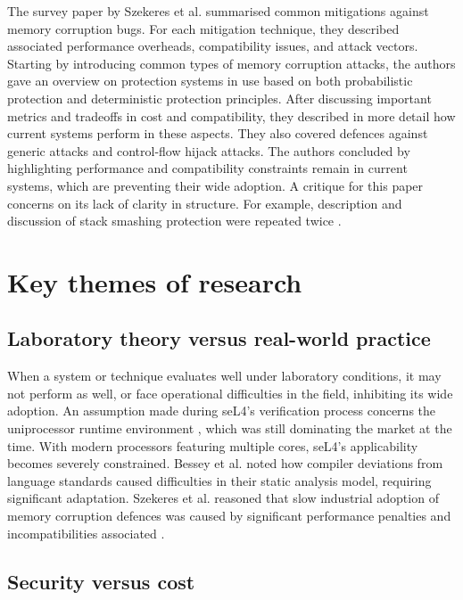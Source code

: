 \documentclass[11pt]{article}
\begin{document}
The survey paper by Szekeres et al. \cite{szekeres2013sok} summarised common mitigations against memory corruption bugs. For each mitigation technique, they described associated performance overheads, compatibility issues, and attack vectors. Starting by introducing common types of memory corruption attacks, the authors gave an overview on protection systems in use based on both probabilistic protection and deterministic protection principles. After discussing important metrics and tradeoffs in cost and compatibility, they described in more detail how current systems perform in these aspects. They also covered defences against generic attacks and control-flow hijack attacks. The authors concluded by highlighting performance and compatibility constraints remain in current systems, which are preventing their wide adoption. A critique for this paper concerns on its lack of clarity in structure. For example, description and discussion of stack smashing protection were repeated twice \cite[III, VIII-B]{szekeres2013sok}.

\section{Key themes of research}

\subsection{Laboratory theory versus real-world practice}

When a system or technique evaluates well under laboratory conditions, it may not perform as well, or face operational difficulties in the field, inhibiting its wide adoption. An assumption made during seL4's verification process concerns the uniprocessor runtime environment \cite[3.3]{klein2009sel4}, which was still dominating the market at the time. With modern processors featuring multiple cores, seL4's applicability becomes severely constrained. Bessey et al. \cite[pp. 69-70]{bessey2010few} noted how compiler deviations from language standards caused difficulties in their static analysis model, requiring significant adaptation. Szekeres et al. reasoned that slow industrial adoption of memory corruption defences was caused by significant performance penalties and incompatibilities associated \cite[I, IV-C]{szekeres2013sok}.

\subsection{Security versus cost}
\end{document}
